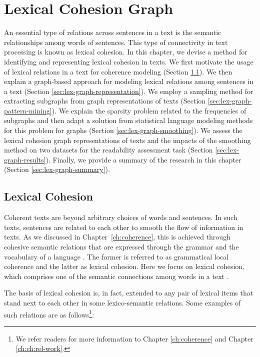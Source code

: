 
\chapter{Lexical Cohesion Graph}
\label{ch:lex-graph}

An essential type of relations across sentences in a text is the semantic relationships among words of sentences. 
This type of connectivity in text processing is known as lexical cohesion. 
In this chapter, we devise a method for identifying and representing lexical cohesion in texts. 
We first motivate the usage of lexical relations in a text for coherence modeling (Section \ref{sec:lex-graph-motivation}). 
We then explain a graph-based approach for modeling lexical relations among sentences in a text (Section \ref{sec:lex-graph-representation}). 
We employ a sampling method for extracting subgraphs from graph representations of texts (Section \ref{sec:lex-graph-pattern-mining}). 
We explain the sparsity problem related to the frequencies of subgraphs and then adapt a solution from statistical language modeling methods for this problem for graphs (Section \ref{sec:lex-graph-smoothing}). 
We assess the lexical cohesion graph representations of texts and the impacts of the smoothing method on two datasets for the readability assessment task (Section \ref{sec:lex-graph-results}). 
Finally, we provide a summary of the research in this chapter (Section \ref{sec:lex-graph-summary}).

\section{Lexical Cohesion}
\label{sec:lex-graph-motivation}

Coherent texts are beyond arbitrary choices of words and sentences.  
In such texts, sentences are related to each other to smooth the flow of information in texts. 
As we discussed in Chapter~\ref{ch:coherence}, this is achieved through cohesive semantic relations that are expressed through the grammar and the vocabulary of a language \cite{halliday76}. 
The former is referred to as grammatical local coherence and the latter as lexical cohesion. 
Here we focus on lexical cohesion, which comprises one of the semantic connections among words in a text \cite{hoey91}. 

The basis of lexical cohesion is, in fact, extended to any pair of lexical items that stand next to each other in some lexico-semantic relations. 
Some examples of such relations are as follows\footnote{We refer readers for more information to Chapter \ref{ch:coherence} and Chapter \ref{ch:ch:rel-work}.}:  

